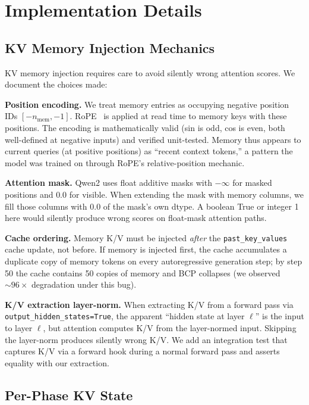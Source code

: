 \section{Implementation Details}
\label{app:implementation}

\subsection{KV Memory Injection Mechanics}

KV memory injection requires care to avoid silently wrong attention scores. We document the choices made:

\textbf{Position encoding.} We treat memory entries as occupying negative position IDs $[-n_\mathrm{mem}, -1]$. RoPE~\citep{su2024roformer} is applied at read time to memory keys with these positions. The encoding is mathematically valid (sin is odd, cos is even, both well-defined at negative inputs) and verified unit-tested. Memory thus appears to current queries (at positive positions) as ``recent context tokens,'' a pattern the model was trained on through RoPE's relative-position mechanic.

\textbf{Attention mask.} Qwen2 uses float additive masks with $-\infty$ for masked positions and $0.0$ for visible. When extending the mask with memory columns, we fill those columns with $0.0$ of the mask's own dtype. A boolean True or integer 1 here would silently produce wrong scores on float-mask attention paths.

\textbf{Cache ordering.} Memory K/V must be injected \emph{after} the \texttt{past\_key\_values} cache update, not before. If memory is injected first, the cache accumulates a duplicate copy of memory tokens on every autoregressive generation step; by step 50 the cache contains 50 copies of memory and BCP collapses (we observed $\sim 96\times$ degradation under this bug).

\textbf{K/V extraction layer-norm.} When extracting K/V from a forward pass via \texttt{output\_hidden\_states=True}, the apparent ``hidden state at layer $\ell$'' is the input to layer $\ell$, but attention computes K/V from the layer-normed input. Skipping the layer-norm produces silently wrong K/V. We add an integration test that captures K/V via a forward hook during a normal forward pass and asserts equality with our extraction.

\subsection{Per-Phase KV State}


